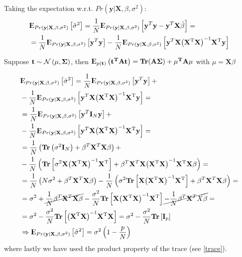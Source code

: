 \documentclass[12pt, letterpaper]{article}
\theoremstyle{definition}
\newcommand{\E}{{\rm I\kern-.3em E}}
\newcommand{\X}{\mathrm{\mathbf{X}}}
\newcommand{\y}{\mathbf{y}}
\newcommand{\Tr}{\mathbf{Tr}}
\newcommand{\hs}{\hat{\sigma}^2}
\newcommand{\inv}{\mathrm{\left( \X^T\X\right)^{-1}}}
\newcommand{\HM}{\mathrm{\inv\X^T}}
\newcommand{\hb}{\mathrm{\hat{\mathbf{\beta}}}}
\begin{document}
Taking the expectation w.r.t. $Pr(\y|\X,\beta, \sigma^2)$:
\begin{equation}
\begin{aligned}
&\E_{Pr(\y|\X,\beta, \sigma^2)} \left[\hs\right] = \frac{1}{N}\E_{Pr(\y|\X,\beta, \sigma^2)} \left[\y^T\y - \y^T\X\hb \right] =\\
&=\frac{1}{N}\E_{Pr(\y|\X,\beta, \sigma^2)} \left[\y^T\y \right] - \frac{1}{N}\E_{Pr(\y|\X,\beta, \sigma^2)} \left[\y^T\X\HM \y \right] 
\end{aligned}
\end{equation}

Suppose $\mathbf{t} \sim  \CMcal{N}\left(\mathbf{\mu}, \mathbf{\Sigma} \right)$, then $\E_{p(\mathbf{t})} \left( \mathbf{t^TAt}\right)= \Tr(\mathbf{A\Sigma})+\mathbf{\mu^TA\mu}$ with $\mu = \X\beta$

\begin{equation}
\begin{aligned}
&\E_{Pr(\y|\X,\beta, \sigma^2)} \left[\hs\right] =\frac{1}{N}\E_{Pr(\y|\X,\beta, \sigma^2)} \left[\y^T\y \right] +\\
&- \frac{1}{N}\E_{Pr(\y|\X,\beta, \sigma^2)} \left[\y^T\X\HM \y \right]  = \\
&= \frac{1}{N}\E_{Pr(\y|\X,\beta, \sigma^2)} \left[\y^T\mathbf{I}_N\y \right] +\\
&- \frac{1}{N}\E_{Pr(\y|\X,\beta, \sigma^2)} \left[\y^T\X\HM \y \right]  = \\
&=\frac{1}{N}\left(\Tr\left(\sigma^2\mathbf{I}_N\right) +\beta^T\X^T\X\beta \right) + \\
&- \frac{1}{N}\left(\Tr\left[\sigma^2\X\HM\right] +\beta^T\X^T\X\HM\X\beta  \right) =\\
&= \frac{1}{N}\left(N\sigma^2 +\beta^T\X^T\X\beta \right) - \frac{1}{N}\left(\sigma^2\Tr\left[\X\HM\right] +\beta^T\X^T\X\beta  \right) =\\
&= \sigma^2 +\cancel{\frac{1}{N}\beta^T\X^T\X\beta} -\frac{\sigma^2}{N}\Tr\left[\X\HM\right] \cancel{-\frac{1}{N}\beta^T\X^TX\beta} = \\
&=\sigma^2 -\frac{\sigma^2}{N}\Tr\left[\HM\X\right] = \sigma^2 -\frac{\sigma^2}{N}\Tr\left[\mathbf{I}_p\right]  \\
&\Rightarrow \E_{Pr(\y|\X,\beta, \sigma^2)} \left[\hs\right] = \sigma^2 \left( 1 - \frac{p}{N}\right)
\end{aligned}
\end{equation}
where lastly we have used the product property of the trace (see \autoref{trace}).
\end{document}
